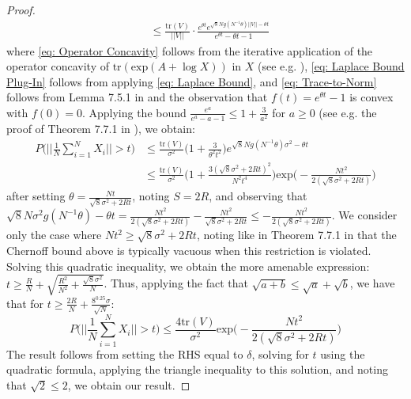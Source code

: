 \documentclass[accepted]{article}
\theoremstyle{definition}
\begin{document}
\begin{proof}
\begin{align}
    & \leq \frac{\text{tr}(V)}{||V||} \cdot \frac{e^{\theta t}e^{\sqrt{8}N g(N^{-1} \theta)||V|| - \theta t}}{e^{\theta t} - \theta t - 1} \nonumber
\end{align}
where \eqref{eq: Operator Concavity} follows from the iterative application of the operator concavity of $\text{tr}(\text{exp}(A + \log X))$ in $X$ (see e.g. \cite{tropp2015introduction}), \eqref{eq: Laplace Bound Plug-In} follows from applying \eqref{eq: Laplace Bound}, and \eqref{eq: Trace-to-Norm} follows from Lemma 7.5.1 in \cite{tropp2015introduction} and the observation that $f(t) = e^{\theta t} - 1$ is convex with $f(0) = 0$. Applying the bound $\frac{e^{a}}{e^{a} - a - 1} \leq 1 + \frac{3}{a^2}$ for $a \geq 0$ (see e.g. the proof of Theorem 7.7.1 in \cite{tropp2015introduction}), we obtain:
\begin{align*}
    P\Big(\Big|\Big|\frac{1}{N}\sum_{i = 1}^N X_i\Big|\Big| > t \Big) & \leq \frac{\text{tr}(V)}{\sigma^2}\Big(1 + \frac{3}{\theta^2 t^2}\Big)e^{\sqrt{8}N g(N^{-1} \theta)\sigma^2 - \theta t} \\
    & \leq \frac{\text{tr}(V)}{\sigma^2}\Big(1 + \frac{3(\sqrt{8}\sigma^2 + 2Rt)^2}{N^2 t^4}\Big)\text{exp}\Big(-\frac{N t^2}{2(\sqrt{8}\sigma^2 + 2Rt)}\Big)
\end{align*}
after setting $\theta = \frac{Nt}{\sqrt{8}\sigma^2 + 2Rt}$, noting $S = 2R$, and observing that $\sqrt{8}N \sigma^2 g(N^{-1}\theta) - \theta t = \frac{N t^2}{2(\sqrt{8}\sigma^2 + 2Rt)} - \frac{N t^2}{\sqrt{8}\sigma^2 + 2Rt} \leq - \frac{N t^2}{2(\sqrt{8}\sigma^2 + 2Rt)}$. We consider only the case where $N t^2 \geq \sqrt{8}\sigma^2 + 2Rt$, noting like in Theorem 7.7.1 in \cite{tropp2015introduction} that the Chernoff bound above is typically vacuous when this restriction is violated. Solving this quadratic inequality,  we obtain the more amenable expression: $t \geq \frac{R}{N} + \sqrt{\frac{R^2}{N^2} + \frac{\sqrt{8}\sigma^2}{N}}$. Thus, applying the fact that $\sqrt{a + b} \leq \sqrt{a} + \sqrt{b}$, we have that for $t \geq \frac{2R}{N} + \frac{8^{0.25}\sigma}{\sqrt{N}}$:
\begin{equation*}
    P\Big(\Big|\Big|\frac{1}{N}\sum_{i = 1}^N X_i\Big|\Big| > t \Big) \leq \frac{4\text{tr}(V)}{\sigma^2}\text{exp}\Big(-\frac{N t^2}{2(\sqrt{8}\sigma^2 + 2Rt)}\Big)
\end{equation*}
The result follows from setting the RHS equal to $\delta$, solving for $t$ using the quadratic formula, applying the triangle inequality to this solution, and noting that $\sqrt{2} \leq 2$, we obtain our result. 
\end{proof}
\end{document}
